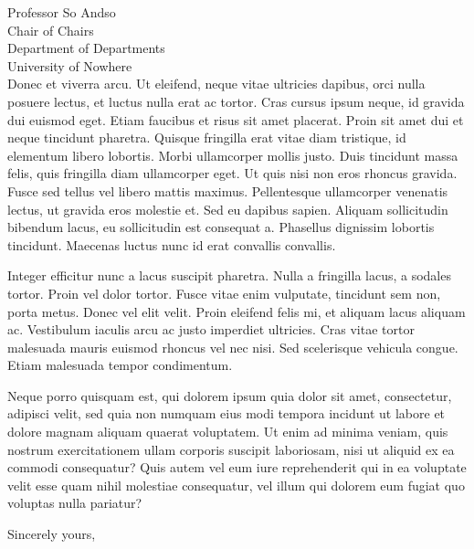 \documentclass[letterpaper]{mscsletter2015}
\begin{document}
\begin{letter}{
Professor So Andso\\
Chair of Chairs\\
Department of Departments\\
University of Nowhere\\
}
Donec et viverra arcu. Ut eleifend, neque vitae ultricies dapibus,
orci nulla posuere lectus, et luctus nulla erat ac tortor. Cras cursus
ipsum neque, id gravida dui euismod eget. Etiam faucibus et risus sit
amet placerat. Proin sit amet dui et neque tincidunt pharetra. Quisque
fringilla erat vitae diam tristique, id elementum libero
lobortis. Morbi ullamcorper mollis justo. Duis tincidunt massa felis,
quis fringilla diam ullamcorper eget. Ut quis nisi non eros rhoncus
gravida. Fusce sed tellus vel libero mattis maximus. Pellentesque
ullamcorper venenatis lectus, ut gravida eros molestie et. Sed eu
dapibus sapien. Aliquam sollicitudin bibendum lacus, eu sollicitudin
est consequat a. Phasellus dignissim lobortis tincidunt. Maecenas
luctus nunc id erat convallis convallis.

Integer efficitur nunc a lacus suscipit pharetra. Nulla a fringilla
lacus, a sodales tortor. Proin vel dolor tortor. Fusce vitae enim
vulputate, tincidunt sem non, porta metus. Donec vel elit velit. Proin
eleifend felis mi, et aliquam lacus aliquam ac. Vestibulum iaculis
arcu ac justo imperdiet ultricies. Cras vitae tortor malesuada mauris
euismod rhoncus vel nec nisi. Sed scelerisque vehicula congue. Etiam
malesuada tempor condimentum.

Neque porro quisquam est, qui dolorem ipsum quia dolor sit amet,
consectetur, adipisci velit, sed quia non numquam eius modi tempora
incidunt ut labore et dolore magnam aliquam quaerat voluptatem. Ut
enim ad minima veniam, quis nostrum exercitationem ullam corporis
suscipit laboriosam, nisi ut aliquid ex ea commodi consequatur? Quis
autem vel eum iure reprehenderit qui in ea voluptate velit esse quam
nihil molestiae consequatur, vel illum qui dolorem eum fugiat quo
voluptas nulla pariatur?

\closing{Sincerely yours,}

\end{letter}
\end{document}
